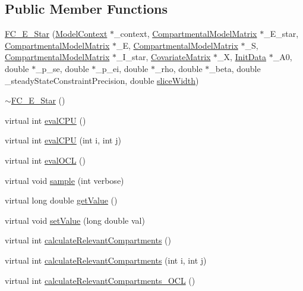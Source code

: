 \subsection*{Public Member Functions}
\begin{DoxyCompactItemize}
\item 
\hyperlink{classSpatialSEIR_1_1FC__E__Star_a8ab5e396dcad65490e26840f8650e60d}{F\-C\-\_\-\-E\-\_\-\-Star} (\hyperlink{classSpatialSEIR_1_1ModelContext}{Model\-Context} $\ast$\-\_\-context, \hyperlink{classSpatialSEIR_1_1CompartmentalModelMatrix}{Compartmental\-Model\-Matrix} $\ast$\-\_\-\-E\-\_\-star, \hyperlink{classSpatialSEIR_1_1CompartmentalModelMatrix}{Compartmental\-Model\-Matrix} $\ast$\-\_\-\-E, \hyperlink{classSpatialSEIR_1_1CompartmentalModelMatrix}{Compartmental\-Model\-Matrix} $\ast$\-\_\-\-S, \hyperlink{classSpatialSEIR_1_1CompartmentalModelMatrix}{Compartmental\-Model\-Matrix} $\ast$\-\_\-\-I\-\_\-star, \hyperlink{classSpatialSEIR_1_1CovariateMatrix}{Covariate\-Matrix} $\ast$\-\_\-\-X, \hyperlink{classSpatialSEIR_1_1InitData}{Init\-Data} $\ast$\-\_\-\-A0, double $\ast$\-\_\-p\-\_\-se, double $\ast$\-\_\-p\-\_\-ei, double $\ast$\-\_\-rho, double $\ast$\-\_\-beta, double \-\_\-steady\-State\-Constraint\-Precision, double \hyperlink{classSpatialSEIR_1_1FullConditional_a150ee031af8d086ad0a04b13630a110f}{slice\-Width})
\item 
\hyperlink{classSpatialSEIR_1_1FC__E__Star_a98ef08bbb6df10be653ca6378df999f9}{$\sim$\-F\-C\-\_\-\-E\-\_\-\-Star} ()
\item 
virtual int \hyperlink{classSpatialSEIR_1_1FC__E__Star_aa2ab67da56b73273fa65a08dfa888edc}{eval\-C\-P\-U} ()
\item 
virtual int \hyperlink{classSpatialSEIR_1_1FC__E__Star_afd869deb206dbf7f3bc9a7666889789f}{eval\-C\-P\-U} (int i, int j)
\item 
virtual int \hyperlink{classSpatialSEIR_1_1FC__E__Star_a3e8a1e567c74935e6162b12f6f88766e}{eval\-O\-C\-L} ()
\item 
virtual void \hyperlink{classSpatialSEIR_1_1FC__E__Star_a1b3d3d4cc4b384bbe35952ac8cc884be}{sample} (int verbose)
\item 
virtual long double \hyperlink{classSpatialSEIR_1_1FC__E__Star_aa5df0a2e3cc79e4d01db7a39bab33d4f}{get\-Value} ()
\item 
virtual void \hyperlink{classSpatialSEIR_1_1FC__E__Star_a5d478a601b037cec1d430f8daa7b8cf1}{set\-Value} (long double val)
\item 
virtual int \hyperlink{classSpatialSEIR_1_1FC__E__Star_a3319916883c6d718ce6a361c6b89064e}{calculate\-Relevant\-Compartments} ()
\item 
virtual int \hyperlink{classSpatialSEIR_1_1FC__E__Star_a411225f483aa006803538599e6ee1bba}{calculate\-Relevant\-Compartments} (int i, int j)
\item 
virtual int \hyperlink{classSpatialSEIR_1_1FC__E__Star_a92265cb76c12e8527634f9b2dce07962}{calculate\-Relevant\-Compartments\-\_\-\-O\-C\-L} ()
\end{DoxyCompactItemize}

